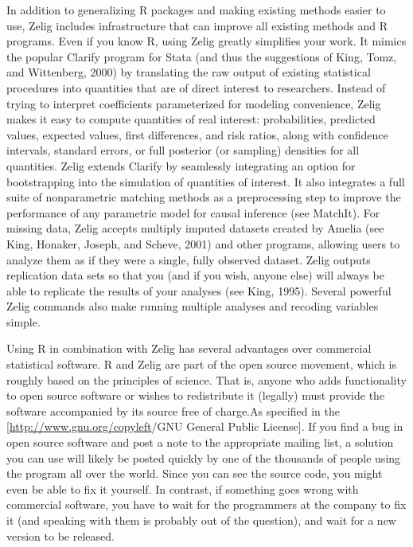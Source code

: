 \documentclass[letterpaper,10pt,english]{sphinxmanual}
\begin{document}
In addition to generalizing R packages and making existing methods easier to use, Zelig includes infrastructure that can improve all existing methods and R programs. Even if you know R, using Zelig greatly simplifies your work. It mimics the popular Clarify program for Stata (and thus the suggestions of King, Tomz, and Wittenberg, 2000) by translating the raw output of existing statistical procedures into quantities that are of direct interest to researchers. Instead of trying to interpret coefficients parameterized for modeling convenience, Zelig makes it easy to compute quantities of real interest: probabilities, predicted values, expected values, first differences, and risk ratios, along with confidence intervals, standard errors, or full posterior (or sampling) densities for all quantities. Zelig extends Clarify by seamlessly integrating an option for bootstrapping into the simulation of quantities of interest. It also integrates a full suite of nonparametric matching methods as a preprocessing step to improve the performance of any parametric model for causal inference (see MatchIt). For missing data, Zelig accepts multiply imputed datasets created by Amelia (see King, Honaker, Joseph, and Scheve, 2001) and other programs, allowing users to analyze them as if they were a single, fully observed dataset. Zelig outputs replication data sets so that you (and if you wish, anyone else) will always be able to replicate the results of your analyses (see King, 1995). Several powerful Zelig commands also make running multiple analyses and recoding variables simple.

Using R in combination with Zelig has several advantages over commercial statistical software. R and Zelig are part of the open source movement, which is roughly based on the principles of science. That is, anyone who adds functionality to open source software or wishes to redistribute it (legally) must provide the software accompanied by its source free of charge.As specified in the {[}\href{http://www.gnu.org/copyleft}{http://www.gnu.org/copyleft}/\textbar{}\textbar{}GNU General Public License{]}. If you find a bug in open source software and post a note to the appropriate mailing list, a solution you can use will likely be posted quickly by one of the thousands of people using the program all over the world. Since you can see the source code, you might even be able to fix it yourself. In contrast, if something goes wrong with commercial software, you have to wait for the programmers at the company to fix it (and speaking with them is probably out of the question), and wait for a new version to be released.
\end{document}
